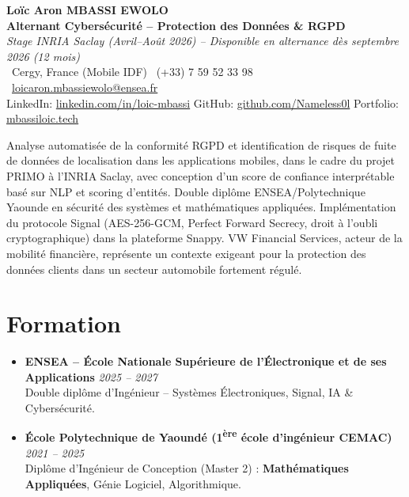 \documentclass[a4paper,11pt]{article}
\begin{document}
\begin{center}
    {\Large \textbf{Lo\"ic Aron MBASSI EWOLO}} \\ \vspace{4pt}
    \textbf{\large Alternant Cybersécurité -- Protection des Donn\'ees \& RGPD} \\
    \textit{\small Stage INRIA Saclay (Avril--Ao\^ut 2026) -- Disponible en alternance d\`es septembre 2026 (12 mois)} \\ \vspace{4pt}
    \small
    \Pointinghand\ Cergy, France (Mobile IDF) \quad \Mobilefone\ (+33) 7 59 52 33 98 \quad
    {\color{primary}\Letter\ \href{mailto:loicaron.mbassiewolo@ensea.fr}{loicaron.mbassiewolo@ensea.fr}} \\ \vspace{2pt}
    {\color{primary}LinkedIn: \href{https://www.linkedin.com/in/loic-mbassi/}{linkedin.com/in/loic-mbassi}} \quad
    {\color{primary}GitHub: \href{https://github.com/Nameless0l}{github.com/Nameless0l}} \quad
    {\color{primary}Portfolio: \href{https://mbassiloic.tech}{mbassiloic.tech}}
\end{center}
\vspace{-6pt}
\noindent\small{Analyse automatis\'ee de la conformit\'e RGPD et identification de risques de fuite de donn\'ees de localisation dans les applications mobiles, dans le cadre du projet PRIMO \`a l'INRIA Saclay, avec conception d'un score de confiance interpr\'etable bas\'e sur NLP et scoring d'entit\'es. Double dipl\^ome ENSEA/Polytechnique Yaounde en s\'ecurit\'e des syst\`emes et math\'ematiques appliqu\'ees. Impl\'ementation du protocole Signal (AES-256-GCM, Perfect Forward Secrecy, droit \`a l'oubli cryptographique) dans la plateforme Snappy. VW Financial Services, acteur de la mobilit\'e financi\`ere, repr\'esente un contexte exigeant pour la protection des donn\'ees clients dans un secteur automobile fortement r\'egul\'e.}

\section{Formation}
\begin{itemize}[leftmargin=*, label=\tiny$\bullet$, nosep]
    \item \textbf{ENSEA -- \'Ecole Nationale Sup\'erieure de l'\'Electronique et de ses Applications} \hfill \textit{2025 -- 2027} \\
    \small{Double dipl\^ome d'Ing\'enieur -- Syst\`emes \'Electroniques, Signal, IA \& Cybersécurité.}
    \item \textbf{\'Ecole Polytechnique de Yaound\'e (1\textsuperscript{\`ere} \'ecole d'ing\'enieur CEMAC)} \hfill \textit{2021 -- 2025} \\
    \small{Dipl\^ome d'Ing\'enieur de Conception (Master 2) : \textbf{Math\'ematiques Appliqu\'ees}, G\'enie Logiciel, Algorithmique.}
\end{itemize}
\end{document}
